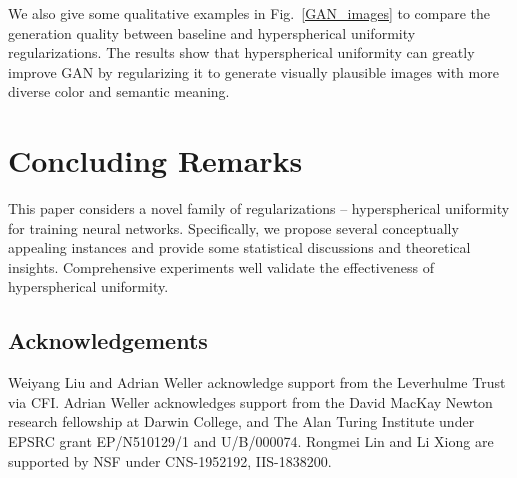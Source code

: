 We also give some qualitative examples in Fig.~\ref{GAN_images} to compare the generation quality between baseline and hyperspherical uniformity regularizations. The results show that hyperspherical uniformity can greatly improve GAN by regularizing it to generate visually plausible images with more diverse color and semantic meaning.

\section{Concluding Remarks}

This paper considers a novel family of regularizations -- hyperspherical uniformity for training neural networks. Specifically, we propose several conceptually appealing instances and provide some statistical discussions and theoretical insights. Comprehensive experiments well validate the effectiveness of hyperspherical uniformity.

\subsection*{Acknowledgements}

Weiyang Liu and Adrian Weller acknowledge support from the Leverhulme Trust via CFI. Adrian Weller acknowledges support from the David MacKay Newton research fellowship at Darwin College, and The Alan Turing Institute under EPSRC grant EP/N510129/1 and U/B/000074. Rongmei Lin and Li Xiong are supported by NSF under CNS-1952192, IIS-1838200.


